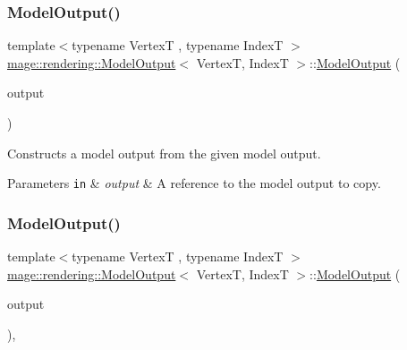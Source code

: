 \subsubsection{\texorpdfstring{Model\+Output()}{ModelOutput()}\hspace{0.1cm}{\footnotesize\ttfamily [2/3]}}
{\footnotesize\ttfamily template$<$typename VertexT , typename IndexT $>$ \\
\hyperlink{structmage_1_1rendering_1_1_model_output}{mage\+::rendering\+::\+Model\+Output}$<$ VertexT, IndexT $>$\+::\hyperlink{structmage_1_1rendering_1_1_model_output}{Model\+Output} (\begin{DoxyParamCaption}\item[{const \hyperlink{structmage_1_1rendering_1_1_model_output}{Model\+Output}$<$ VertexT, IndexT $>$ \&}]{output }\end{DoxyParamCaption})\hspace{0.3cm}{\ttfamily [delete]}}

Constructs a model output from the given model output.


\begin{DoxyParams}[1]{Parameters}
\mbox{\tt in}  & {\em output} & A reference to the model output to copy. \\
\hline
\end{DoxyParams}
\hypertarget{structmage_1_1rendering_1_1_model_output_a449de2164c45500f02bbe03f4bdc648f}{}\label{structmage_1_1rendering_1_1_model_output_a449de2164c45500f02bbe03f4bdc648f} 
\subsubsection{\texorpdfstring{Model\+Output()}{ModelOutput()}\hspace{0.1cm}{\footnotesize\ttfamily [3/3]}}
{\footnotesize\ttfamily template$<$typename VertexT , typename IndexT $>$ \\
\hyperlink{structmage_1_1rendering_1_1_model_output}{mage\+::rendering\+::\+Model\+Output}$<$ VertexT, IndexT $>$\+::\hyperlink{structmage_1_1rendering_1_1_model_output}{Model\+Output} (\begin{DoxyParamCaption}\item[{\hyperlink{structmage_1_1rendering_1_1_model_output}{Model\+Output}$<$ VertexT, IndexT $>$ \&\&}]{output }\end{DoxyParamCaption})\hspace{0.3cm}{\ttfamily [default]}, {\ttfamily [noexcept]}}

